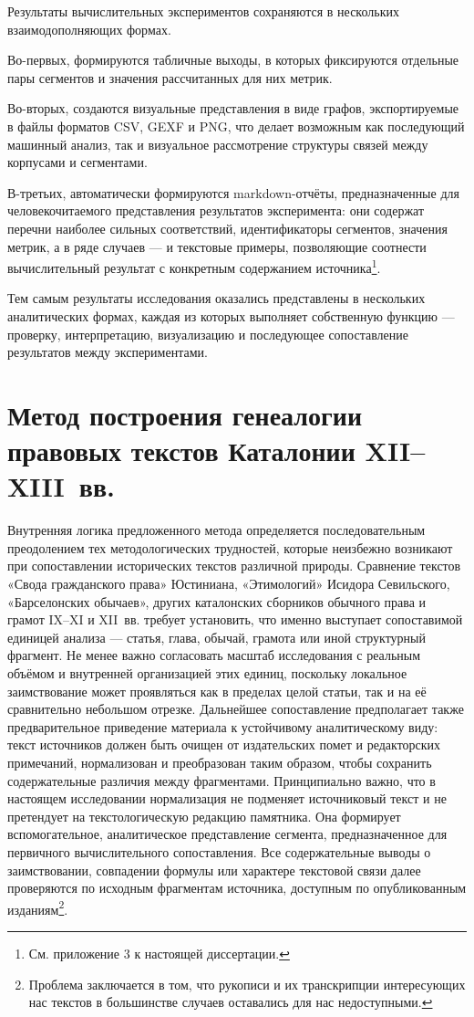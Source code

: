 Результаты вычислительных экспериментов сохраняются в нескольких взаимодополняющих формах.

Во-первых, формируются табличные выходы, в которых фиксируются отдельные пары сегментов и значения рассчитанных для них метрик.

Во-вторых, создаются визуальные представления в виде графов, экспортируемые в файлы форматов CSV, GEXF и PNG, что делает возможным как последующий машинный анализ, так и визуальное рассмотрение структуры связей между корпусами и сегментами.

В-третьих, автоматически формируются markdown-отчёты, предназначенные для человекочитаемого представления результатов эксперимента: они содержат перечни наиболее сильных соответствий, идентификаторы сегментов, значения метрик, а в ряде случаев --- и текстовые примеры, позволяющие соотнести вычислительный результат с конкретным содержанием источника\footnote{См. приложение 3 к настоящей диссертации.}.

Тем самым результаты исследования оказались представлены в нескольких аналитических формах, каждая из которых выполняет собственную функцию --- проверку, интерпретацию, визуализацию и последующее сопоставление результатов между экспериментами.

\section{Метод построения генеалогии правовых текстов Каталонии XII--XIII~вв.}

Внутренняя логика предложенного метода определяется последовательным преодолением тех методологических трудностей, которые неизбежно возникают при сопоставлении исторических текстов различной природы. Сравнение текстов «Свода гражданского права» Юстиниана, «Этимологий» Исидора Севильского, «Барселонских обычаев», других каталонских сборников обычного права и грамот IX--XI и XII~вв. требует установить, что именно выступает сопоставимой единицей анализа --- статья, глава, обычай, грамота или иной структурный фрагмент. Не менее важно согласовать масштаб исследования с реальным объёмом и внутренней организацией этих единиц, поскольку локальное заимствование может проявляться как в пределах целой статьи, так и на её сравнительно небольшом отрезке. Дальнейшее сопоставление предполагает также предварительное приведение материала к устойчивому аналитическому виду: текст источников должен быть очищен от издательских помет и редакторских примечаний, нормализован и преобразован таким образом, чтобы сохранить содержательные различия между фрагментами. Принципиально важно, что в настоящем исследовании нормализация не подменяет источниковый текст и не претендует на текстологическую редакцию памятника. Она формирует вспомогательное, аналитическое представление сегмента, предназначенное для первичного вычислительного сопоставления. Все содержательные выводы о заимствовании, совпадении формулы или характере текстовой связи далее проверяются по исходным фрагментам источника, доступным по опубликованным изданиям\footnote{Проблема заключается в том, что рукописи и их транскрипции интересующих нас текстов в большинстве случаев оставались для нас недоступными.}.

